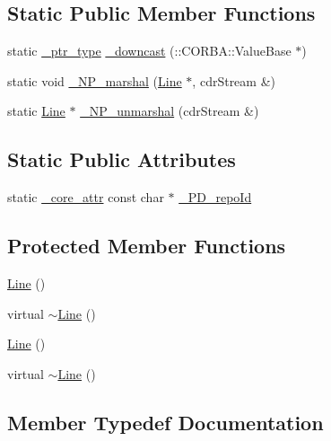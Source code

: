 \subsection*{Static Public Member Functions}
\begin{DoxyCompactItemize}
\item 
static \hyperlink{class_draw_a5164256572b3c4123ceecd1897c248dd}{\+\_\+ptr\+\_\+type} \hyperlink{class_line_afa65669cf372e878732863fd66902d1d}{\+\_\+downcast} (\+::C\+O\+R\+B\+A\+::\+Value\+Base $\ast$)
\item 
static void \hyperlink{class_line_ae2475a529c9b0ed1f7eb9ca396b35999}{\+\_\+\+N\+P\+\_\+marshal} (\hyperlink{class_line}{Line} $\ast$, cdr\+Stream \&)
\item 
static \hyperlink{class_line}{Line} $\ast$ \hyperlink{class_line_a81748df80cd480d249f192c649df8e1e}{\+\_\+\+N\+P\+\_\+unmarshal} (cdr\+Stream \&)
\end{DoxyCompactItemize}
\subsection*{Static Public Attributes}
\begin{DoxyCompactItemize}
\item 
static \hyperlink{_petit_prince_8hpp_a5f7bf7cddb608c2aad7c95f55f8a33c5}{\+\_\+core\+\_\+attr} const char $\ast$ \hyperlink{class_line_a38707cdd2f006195ad299c521928dc32}{\+\_\+\+P\+D\+\_\+repo\+Id}
\end{DoxyCompactItemize}
\subsection*{Protected Member Functions}
\begin{DoxyCompactItemize}
\item 
\hyperlink{class_line_acc11b8a429d8cdd63ba6803dff5602b3}{Line} ()
\item 
virtual \hyperlink{class_line_a4a95bafcefa28672b3999deb011b9e50}{$\sim$\+Line} ()
\item 
\hyperlink{class_line_acc11b8a429d8cdd63ba6803dff5602b3}{Line} ()
\item 
virtual \hyperlink{class_line_a4a95bafcefa28672b3999deb011b9e50}{$\sim$\+Line} ()
\end{DoxyCompactItemize}


\subsection{Member Typedef Documentation}
